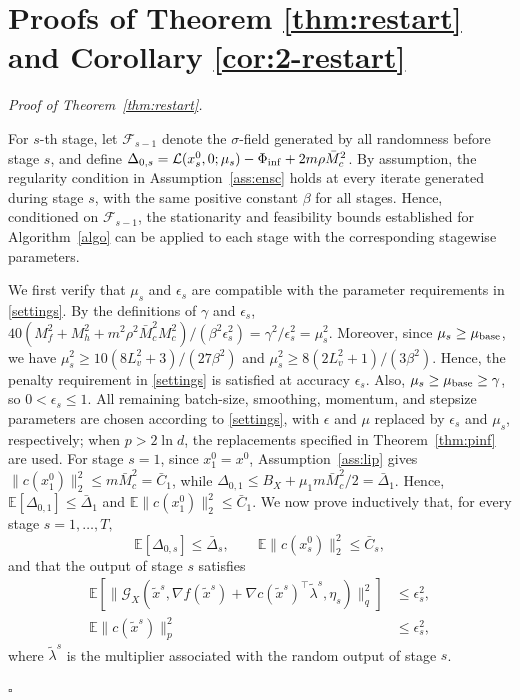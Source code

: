 \documentclass[11pt]{article}
\newenvironment{proof}[1][Proof]{%
    \par\noindent\textit{#1.}\enspace
  }{%
    \hfill\ensuremath{\square}\par
  }%
\numberwithin{equation}{section}
\begin{document}
\section{Proofs of Theorem \ref{thm:restart} and Corollary \ref{cor:2-restart}}
\label{app:restart}

\begin{proof}[Proof of Theorem~\ref{thm:restart}]
For \(s\)-th stage, let \(\mathcal F_{s-1}\) denote the \(\sigma\)-field generated by all randomness before stage \(s\), and define \(\Delta_{0,s}=\mathcal L(x_s^0,0;\mu_s)-\Phi_{\rm inf}+2m\rho \bar{M}_c^2\). By assumption, the regularity condition in Assumption~\ref{ass:ensc} holds at every iterate generated during stage \(s\), with the same positive constant \(\beta\) for all stages. Hence, conditioned on \(\mathcal F_{s-1}\), the stationarity and feasibility bounds established for Algorithm~\ref{algo} can be applied to each stage with the corresponding stagewise parameters.

We first verify that \(\mu_s\) and \(\epsilon_s\) are compatible with the parameter requirements in \eqref{settings}. By the definitions of \(\gamma\) and \(\epsilon_s\), \(40(M_f^2+M_h^2+m^2\rho^2\bar{M}_c^2M_c^2)/(\beta^2\epsilon_s^2)=\gamma^2/\epsilon_s^2=\mu_s^2\). Moreover, since \(\mu_s\ge\mu_{\rm base}\), we have \(\mu_s^2\ge 10(8L_v^2+3)/(27\beta^2)\) and \(\mu_s^2\ge8(2L_v^2+1)/(3\beta^2)\). Hence, the penalty requirement in \eqref{settings} is satisfied at accuracy \(\epsilon_s\). Also, \(\mu_s\ge\mu_{\rm base}\ge\gamma\), so \(0<\epsilon_s\le1\). All remaining batch-size, smoothing, momentum, and stepsize parameters are chosen according to \eqref{settings}, with \(\epsilon\) and \(\mu\) replaced by \(\epsilon_s\) and \(\mu_s\), respectively; when \(p>2\ln d\), the replacements specified in Theorem~\ref{thm:pinf} are used. 
For stage \(s=1\), since \(x_1^0=x^0\), Assumption~\ref{ass:lip} gives \(\|c(x_1^0)\|_2^2\le m\bar{M}_c^2=\bar C_1\), while \(\Delta_{0,1}\le B_X+\mu_1m\bar{M}_c^2/2=\bar\Delta_1\). Hence, \(\mathbb E[\Delta_{0,1}]\le\bar\Delta_1\) and \(\mathbb E\|c(x_1^0)\|_2^2\le\bar C_1\). We now prove inductively that, for every stage \(s=1,\ldots,T,\)
\begin{equation}\label{eq:restart-initial-bounds}
\mathbb E[\Delta_{0,s}]\le\bar\Delta_s,
\qquad
\mathbb E\|c(x_s^0)\|_2^2\le\bar C_s,
\end{equation}
and that the output of stage \(s\) satisfies
\begin{align}
\mathbb E[\|\mathcal G_X(\tilde x^s,\nabla f(\tilde x^s)+\nabla c(\tilde x^s)^\top\tilde\lambda^s,\eta_s)\|_q^2]
&\le\epsilon_s^2,
\label{eq:restart-stat}\\
\mathbb E\|c(\tilde x^s)\|_p^2
&\le\epsilon_s^2,
\label{eq:restart-feas}
\end{align}
where \(\tilde\lambda^s\) is the multiplier associated with the random output of stage \(s\).


\end{proof}
\end{document}
